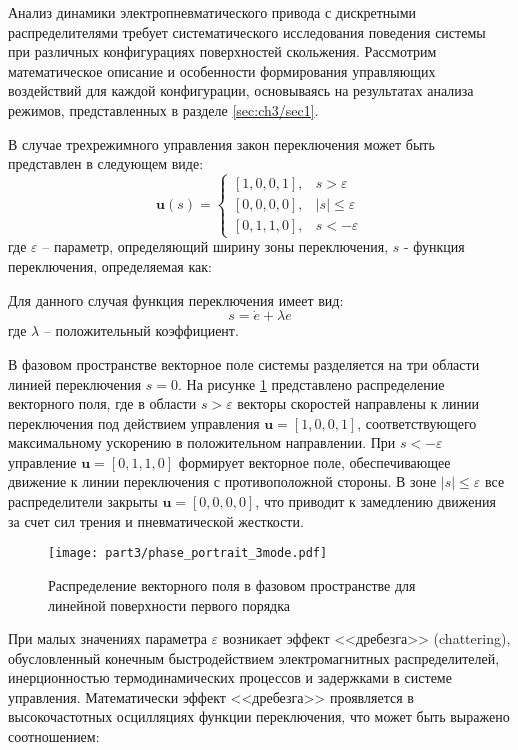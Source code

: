 Анализ динамики электропневматического привода с дискретными распределителями требует
систематического исследования поведения системы при различных конфигурациях поверхностей
скольжения. Рассмотрим математическое описание и особенности формирования управляющих
воздействий для каждой конфигурации, основываясь на результатах анализа режимов, представленных в разделе \ref{sec:ch3/sec1}.

В случае трехрежимного управления закон переключения может быть представлен в следующем виде:
\begin{equation}
	\mathbf{u}(s) = \begin{cases}
		[1,0,0,1], & s > \varepsilon      \\
		[0,0,0,0], & |s| \leq \varepsilon \\
		[0,1,1,0], & s < -\varepsilon
	\end{cases}
\end{equation}
где $\varepsilon$ -- параметр, определяющий ширину зоны переключения, $s$ - функция переключения, определяемая как:

Для данного случая функция переключения имеет вид:
\begin{equation*}
	s = \dot{e} + \lambda e
\end{equation*}
где $\lambda$ -- положительный коэффициент.

В фазовом пространстве векторное поле системы разделяется на три области линией
переключения $s = 0$. На рисунке \ref{fig:vector_field_linear} представлено
распределение векторного поля, где в области $s > \varepsilon$ векторы
скоростей направлены к линии переключения под действием
управления $\mathbf{u} = [1,0,0,1]$, соответствующего максимальному ускорению в положительном
направлении. При $s < -\varepsilon$ управление $\mathbf{u} = [0,1,1,0]$ формирует
векторное поле, обеспечивающее движение к линии переключения с противоположной
стороны. В зоне $|s| \leq \varepsilon$ все распределители закрыты $\mathbf{u} = [0,0,0,0]$,
что приводит к замедлению движения за счет сил трения и пневматической жесткости.
\begin{figure}[h]
	\centering
	\texttt{[image: part3/phase\_portrait\_3mode.pdf]}
	\caption{Распределение векторного поля в фазовом пространстве для линейной поверхности первого порядка}
	\label{fig:vector_field_linear}
\end{figure}

При малых значениях параметра $\varepsilon$ возникает эффект <<дребезга>> (chattering),
обусловленный конечным быстродействием электромагнитных распределителей,
инерционностью термодинамических процессов и задержками в системе управления.
Математически эффект <<дребезга>> проявляется в высокочастотных осцилляциях функции
переключения, что может быть выражено соотношением:

